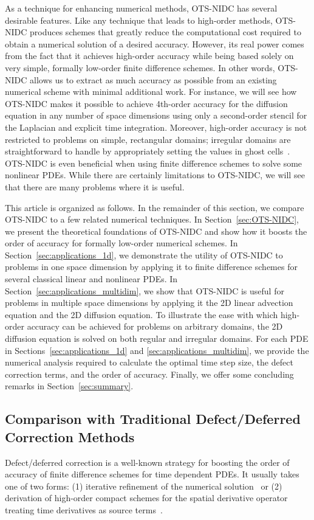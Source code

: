 \documentclass[fleqn,12pt,twoside]{article}
\begin{document}
As a technique for enhancing numerical methods, OTS-NIDC has several desirable 
features.  Like any technique that leads to high-order methods, OTS-NIDC
produces schemes that greatly reduce the computational cost required to obtain 
a numerical solution of a desired accuracy.  However, its real power comes 
from the fact that it achieves high-order accuracy while being based solely on 
very simple, formally low-order finite difference schemes.  In other words, 
OTS-NIDC allows us to extract as much accuracy as possible from an existing 
numerical scheme with minimal additional work.  For instance, we will see how 
OTS-NIDC makes it possible to achieve 4th-order accuracy for the diffusion 
equation in any number of space dimensions using only a second-order stencil 
for the Laplacian and explicit time integration.  
Moreover, high-order accuracy is not restricted to problems 
on simple, rectangular domains; irregular domains are straightforward to 
handle by appropriately setting the values in ghost 
cells~\cite{gibou_2005,ito_2005,fedkiw_1999,osher_fedkiw_book}.  
OTS-NIDC is even beneficial when using finite difference schemes to solve some 
nonlinear PDEs.  While there are certainly limitations to OTS-NIDC, we will 
see that there are many problems where it is useful.  

This article is organized as follows.  In the remainder of this section,
we compare OTS-NIDC to a few related numerical techniques.
In Section~\ref{sec:OTS-NIDC}, we present the theoretical foundations of 
OTS-NIDC and show how it boosts the order of accuracy for formally low-order 
numerical schemes.  
In Section~\ref{sec:applications_1d}, we demonstrate the utility of 
OTS-NIDC to problems in one space dimension by applying it to finite 
difference schemes for several classical linear and nonlinear PDEs.  
In Section~\ref{sec:applications_multidim}, we show that 
OTS-NIDC is useful for problems in multiple space dimensions by applying it
the 2D linear advection equation and the 2D diffusion equation.  To illustrate 
the ease with which high-order accuracy can be achieved for problems on 
arbitrary domains, the 2D diffusion equation is solved on both regular 
and irregular domains.  
For each PDE in Sections~\ref{sec:applications_1d} and 
\ref{sec:applications_multidim}, we provide the numerical analysis required 
to calculate the optimal time step size, the defect correction terms, and the 
order of accuracy.  Finally, we offer some concluding remarks in 
Section~\ref{sec:summary}.


\subsection{Comparison with Traditional Defect/Deferred Correction Methods}
Defect/deferred correction is a well-known strategy for boosting the order of 
accuracy of finite difference schemes for time dependent PDEs.  It usually 
takes one of two forms: 
(1) iterative refinement of the numerical solution~\cite{pereyra_1968,stetter_1978,gustafsson_2002,kress_2002,kress_2006}
or 
(2) derivation of high-order compact schemes for the spatial derivative 
operator treating time derivatives as source 
terms~\cite{spotz_2001,ito_2005,heidenreich_2007}. 
\end{document}
